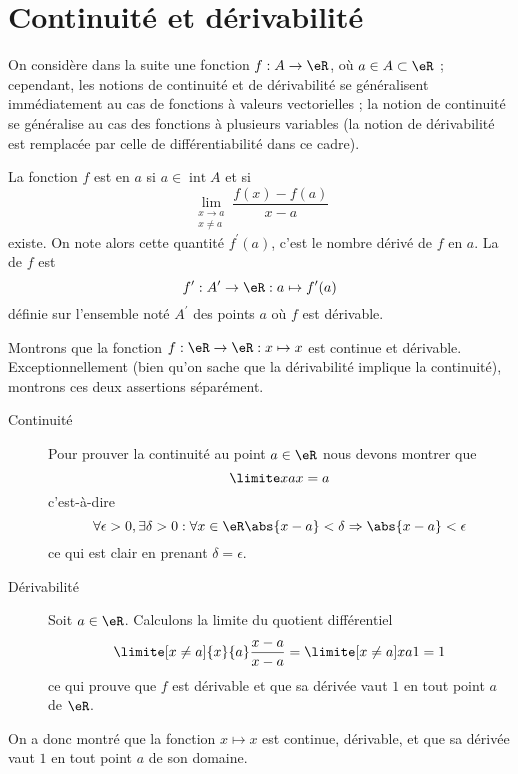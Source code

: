 \section{Continuité et dérivabilité}
\label{seccontetderiv}

On considère dans la suite une fonction $f : A \to \eR$, où $a \in A \subset \eR$ ; cependant, les notions de continuité et de dérivabilité se généralisent immédiatement au cas de fonctions à valeurs vectorielles ; la notion de continuité se généralise au cas des fonctions à plusieurs variables (la notion de dérivabilité est remplacée par celle de différentiabilité dans ce cadre).

\begin{definition}
    La fonction $f$ est  en \( a\) si $a \in
  \operatorname{int} A$ et si
  \begin{equation*}
    \lim_{\substack{x\rightarrow a\\x\neq a}} \frac{f(x)-f(a)}{x-a}
  \end{equation*}
  existe. On note alors cette quantité $f^\prime(a)$, c'est le nombre
  dérivé de $f$ en $a$. La  de $f$ est
  \begin{equation*}
    f^\prime : A^\prime \to \eR : a \mapsto f^\prime(a)
  \end{equation*}
  définie sur l'ensemble noté $A^\prime$ des points $a$ où $f$ est
  dérivable.
\end{definition}

\begin{example}
      Montrons que la fonction $f : \eR \to \eR : x\mapsto x$ est continue et dérivable. Exceptionnellement (bien qu'on sache que la dérivabilité implique la continuité), montrons ces deux assertions séparément.
      \begin{description}
      \item[Continuité] Pour prouver la continuité au point $a \in \eR$ nous devons montrer que
     \begin{equation}
       \limite x a x = a
     \end{equation}
     c'est-à-dire
     \begin{equation}
       \forall \epsilon > 0, \exists \delta > 0 :  \forall x \in \eR \abs{x-a} <
       \delta \Rightarrow \abs{x-a} < \epsilon
     \end{equation}
     ce qui est clair en prenant $\delta = \epsilon$.

      \item[Dérivabilité] Soit $a \in \eR$. Calculons la limite du quotient différentiel
        \begin{equation}
          \limite[x\neq a]{x}{a} \frac{x-a}{x-a} = \limite[x\neq a]x a 1 = 1
        \end{equation}
        ce qui prouve que $f$ est dérivable et que sa dérivée vaut $1$ en
        tout point $a$ de $\eR$.
      \end{description}

     On a donc montré que la fonction $x \mapsto x$ est continue, dérivable, et que sa dérivée vaut $1$ en tout point $a$ de son domaine.

\end{example}

